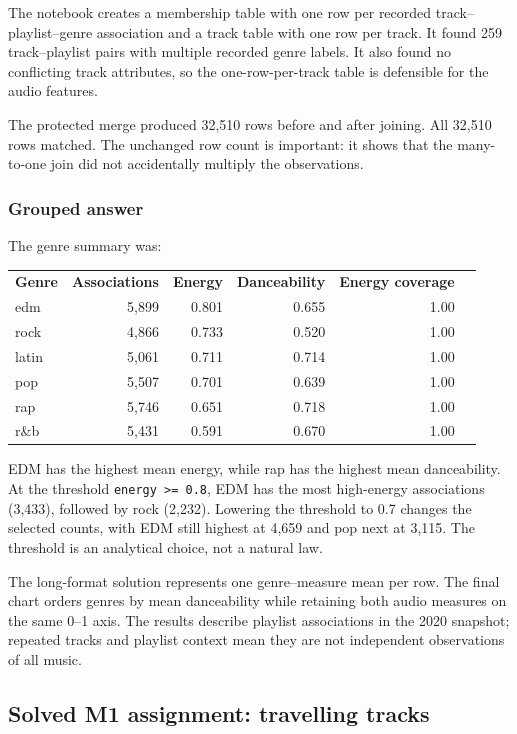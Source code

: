 \documentclass[11pt,a4paper]{article}
\begin{document}
The notebook creates a membership table with one row per recorded track--playlist--genre association and a track table with one row per track. It found 259 track--playlist pairs with multiple recorded genre labels. It also found no conflicting track attributes, so the one-row-per-track table is defensible for the audio features.

The protected merge produced 32,510 rows before and after joining. All 32,510 rows matched. The unchanged row count is important: it shows that the many-to-one join did not accidentally multiply the observations.

\subsubsection{Grouped answer}
The genre summary was:

\begin{center}
\begin{tabular}{lrrrrr}
\textbf{Genre} & \textbf{Associations} & \textbf{Energy} & \textbf{Danceability} & \textbf{Energy coverage} \\
edm & 5,899 & 0.801 & 0.655 & 1.00 \\
rock & 4,866 & 0.733 & 0.520 & 1.00 \\
latin & 5,061 & 0.711 & 0.714 & 1.00 \\
pop & 5,507 & 0.701 & 0.639 & 1.00 \\
rap & 5,746 & 0.651 & 0.718 & 1.00 \\
r\&b & 5,431 & 0.591 & 0.670 & 1.00 \\
\end{tabular}
\end{center}

EDM has the highest mean energy, while rap has the highest mean danceability. At the threshold \texttt{energy >= 0.8}, EDM has the most high-energy associations (3,433), followed by rock (2,232). Lowering the threshold to 0.7 changes the selected counts, with EDM still highest at 4,659 and pop next at 3,115. The threshold is an analytical choice, not a natural law.

The long-format solution represents one genre--measure mean per row. The final chart orders genres by mean danceability while retaining both audio measures on the same 0--1 axis. The results describe playlist associations in the 2020 snapshot; repeated tracks and playlist context mean they are not independent observations of all music.

\subsection{Solved M1 assignment: travelling tracks}
\end{document}
